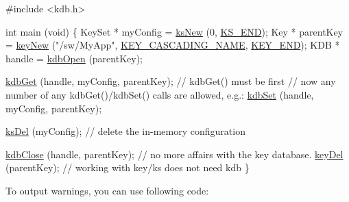 \begin{DoxyCodeInclude}

\textcolor{preprocessor}{#include <kdb.h>}

\textcolor{keywordtype}{int} main (\textcolor{keywordtype}{void})
\{
        KeySet * myConfig = \hyperlink{group__keyset_ga671e1aaee3ae9dc13b4834a4ddbd2c3c}{ksNew} (0, \hyperlink{kdbenum_8c_a7a28fce3773b2c873c94ac80b8b4cd54}{KS\_END});
        Key * parentKey = \hyperlink{group__key_gad23c65b44bf48d773759e1f9a4d43b89}{keyNew} (\textcolor{stringliteral}{"/sw/MyApp"}, \hyperlink{group__key_gga91fb3178848bd682000958089abbaf40afc1567f74444ff9c219f7456b652b4ec}{KEY\_CASCADING\_NAME}, 
      \hyperlink{group__key_gga91fb3178848bd682000958089abbaf40aa8adb6fcb92dec58fb19410eacfdd403}{KEY\_END});
        KDB * handle = \hyperlink{group__kdb_ga6808defe5870f328dd17910aacbdc6ca}{kdbOpen} (parentKey);

        \hyperlink{group__kdb_ga28e385fd9cb7ccfe0b2f1ed2f62453a1}{kdbGet} (handle, myConfig, parentKey); \textcolor{comment}{// kdbGet() must be first}
        \textcolor{comment}{// now any number of any kdbGet()/kdbSet() calls are allowed, e.g.:}
        \hyperlink{group__kdb_ga11436b058408f83d303ca5e996832bcf}{kdbSet} (handle, myConfig, parentKey);

        \hyperlink{group__keyset_ga27e5c16473b02a422238c8d970db7ac8}{ksDel} (myConfig); \textcolor{comment}{// delete the in-memory configuration}

        \hyperlink{group__kdb_gadb54dc9fda17ee07deb9444df745c96f}{kdbClose} (handle, parentKey); \textcolor{comment}{// no more affairs with the key database.}
        \hyperlink{group__key_ga3df95bbc2494e3e6703ece5639be5bb1}{keyDel} (parentKey);          \textcolor{comment}{// working with key/ks does not need kdb}
\}
\end{DoxyCodeInclude}


To output warnings, you can use following code\+:


